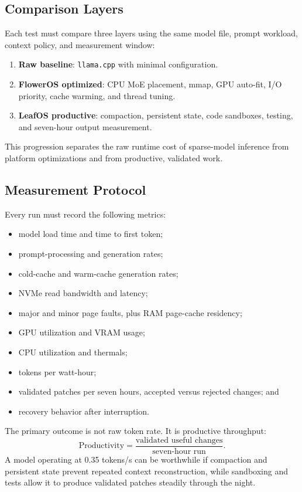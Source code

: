 \documentclass[11pt]{article}
\begin{document}
\subsection{Comparison Layers}

Each test must compare three layers using the same model file, prompt workload, context policy, and measurement window:
\begin{enumerate}
	\item \textbf{Raw baseline}: \texttt{llama.cpp} with minimal configuration.
	\item \textbf{FlowerOS optimized}: CPU MoE placement, mmap, GPU auto-fit, I/O priority, cache warming, and thread tuning.
	\item \textbf{LeafOS productive}: compaction, persistent state, code sandboxes, testing, and seven-hour output measurement.
\end{enumerate}

This progression separates the raw runtime cost of sparse-model inference from platform optimizations and from productive, validated work.

\subsection{Measurement Protocol}

Every run must record the following metrics:
\begin{itemize}
	\item model load time and time to first token;
	\item prompt-processing and generation rates;
	\item cold-cache and warm-cache generation rates;
	\item NVMe read bandwidth and latency;
	\item major and minor page faults, plus RAM page-cache residency;
	\item GPU utilization and VRAM usage;
	\item CPU utilization and thermals;
	\item tokens per watt-hour;
	\item validated patches per seven hours, accepted versus rejected changes; and
	\item recovery behavior after interruption.
\end{itemize}

The primary outcome is not raw token rate. It is productive throughput:
\[
\mathrm{Productivity} =
\frac{\text{validated useful changes}}{\text{seven-hour run}}.
\]
A model operating at 0.35 tokens/s can be worthwhile if compaction and persistent state prevent repeated context reconstruction, while sandboxing and tests allow it to produce validated patches steadily through the night.
\end{document}
